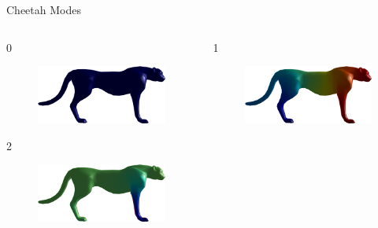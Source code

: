 \documentclass{beamer}
\begin{document}
\begin{frame}{Cheetah Modes}

\begin{columns}
\begin{column}[T]{5cm}
0
\begin{figure}[t]
    \includegraphics[width=\textwidth]{Harmonics/CheetahModes/0.png}
\end{figure}
2
\begin{figure}[t]
    \includegraphics[width=\textwidth]{Harmonics/CheetahModes/2.png}
\end{figure}
\end{column}
\begin{column}[T]{5cm}
1
\begin{figure}[t]
    \includegraphics[width=\textwidth]{Harmonics/CheetahModes/1.png}

\end{figure}
\end{column}
\end{columns}
\end{frame}
\end{document}
